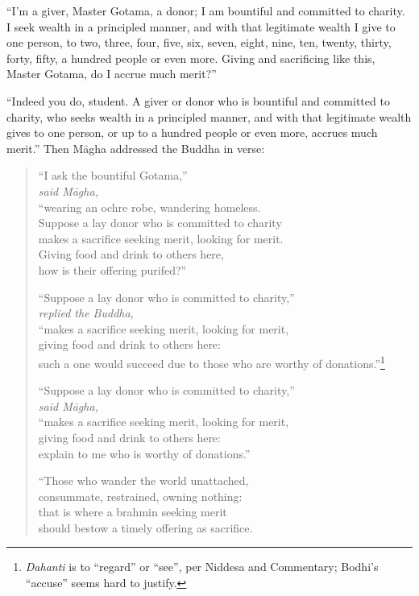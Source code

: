 \documentclass[12pt,openany]{book}%
\newcommand*{\scspeaker}[1]{\hspace{2em}\textit{#1}}
\begin{document}
“I’m a giver, Master Gotama, a donor; I am bountiful and committed to charity. I seek wealth in a principled manner, and with that legitimate wealth I give to one person, to two, three, four, five, six, seven, eight, nine, ten, twenty, thirty, forty, fifty, a hundred people or even more. Giving and sacrificing like this, Master Gotama, do I accrue much merit?” 

“Indeed you do, student. A giver or donor who is bountiful and committed to charity, who seeks wealth in a principled manner, and with that legitimate wealth gives to one person, or up to a hundred people or even more, accrues much merit.” Then \textsanskrit{Māgha} addressed the Buddha in verse: 

\begin{verse}%
“I ask the bountiful Gotama,” \\
\scspeaker{said \textsanskrit{Māgha}, }\\
“wearing an ochre robe, wandering homeless. \\
Suppose a lay donor who is committed to charity \\
makes a sacrifice seeking merit, looking for merit. \\
Giving food and drink to others here, \\
how is their offering purifed?” 

“Suppose a lay donor who is committed to charity,” \\
\scspeaker{replied the Buddha, }\\
“makes a sacrifice seeking merit, looking for merit, \\
giving food and drink to others here: \\
such a one would succeed due to those who are worthy of donations.”\footnote{\textit{Dahanti} is to “regard” or “see”, per Niddesa and Commentary; Bodhi’s “accuse” seems hard to justify. } 

“Suppose a lay donor who is committed to charity,” \\
\scspeaker{said \textsanskrit{Māgha}, }\\
“makes a sacrifice seeking merit, looking for merit, \\
giving food and drink to others here: \\
explain to me who is worthy of donations.” 

“Those who wander the world unattached, \\
consummate, restrained, owning nothing: \\
that is where a brahmin seeking merit \\
should bestow a timely offering as sacrifice. 


\end{verse}
\end{document}
